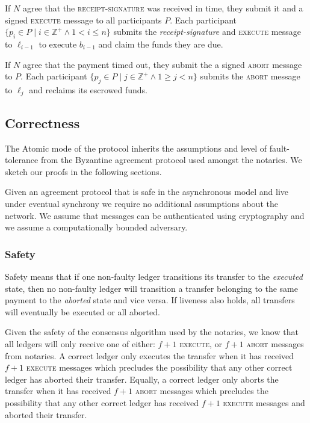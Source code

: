 \documentclass[letterpaper,twocolumn,10pt]{article}
\begin{document}
If $N$ agree that the \textsc{receipt-signature} was received in time, they submit it and a signed \textsc{execute} message to all participants $P$. Each participant $ \{ p_i \in P \mid i \in \mathbb{Z}^+ \land 1 < i \leq n \} $ submits the \textit{receipt-signature} and \textsc{execute} message to $\ell_{i-1}$ to execute $b_{i-1}$ and claim the funds they are due.

If $N$ agree that the payment timed out, they submit the a signed \textsc{abort} message to $P$. Each participant $ \{ p_j \in P \mid j \in \mathbb{Z}^+ \land 1 \geq j < n \} $ submits the \textsc{abort} message to $\ell_j$ and reclaims its escrowed funds. 

\subsection{Correctness}

The Atomic mode of the protocol inherits the assumptions and level of fault-tolerance from the Byzantine agreement protocol used amongst the notaries. We sketch our proofs in the following sections.

Given an agreement protocol that is safe in the asynchronous model and live under eventual synchrony we require no additional assumptions about the network. We assume that messages can be authenticated using cryptography and we assume a computationally bounded adversary.

\subsubsection{Safety}

Safety means that if one non-faulty ledger transitions its transfer to the \textit{executed} state, then no non-faulty ledger will transition a transfer belonging to the same payment to the \textit{aborted} state and vice versa. If liveness also holds, all transfers will eventually be executed or all aborted.

Given the safety of the consensus algorithm used by the notaries, 
we know that all ledgers will only receive one of either: $f + 1$ \textsc{execute}, or $f + 1$ \textsc{abort} messages from notaries. A correct ledger only executes the transfer when it has received $f + 1$ \textsc{execute} messages which precludes the possibility that any other correct ledger has aborted their transfer. Equally, a correct ledger only aborts the transfer when it has received $f + 1$ \textsc{abort} messages which precludes the possibility that any other correct ledger has received $f + 1$ \textsc{execute} messages and aborted their transfer.
\end{document}
